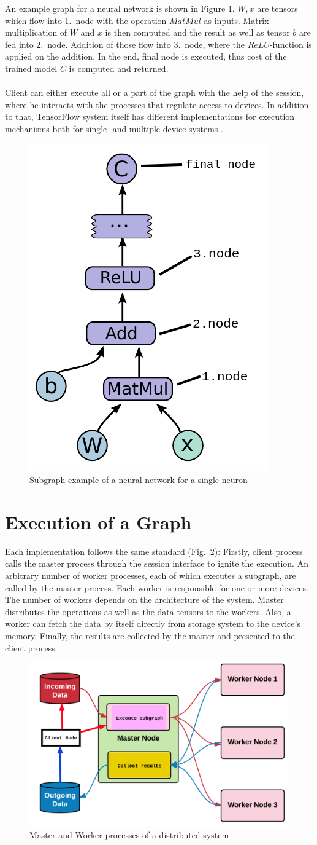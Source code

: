 \documentclass[ieeetran]{article}
\begin{document}
An example graph for a neural network is shown in Figure 1. $W, x$ are tensors which flow into 1.\ node with the operation $MatMul$ as inputs. Matrix multiplication of $W$ and $x$ is then computed and the result as well as tensor $b$ are fed into 2.\ node. Addition of those flow into 3.\ node, where the $ReLU$-function is applied on the addition. In the end, final node is executed, thus cost of the trained model $C$ is computed and returned.
\\ \\Client can either execute all or a part of the graph with the help of the session, where he interacts with the processes that regulate access to devices. In addition to that, TensorFlow system itself has different implementations for execution mechanisms both for single- and multiple-device systems \cite{first}.
\begin{figure}[h!]
  \centering
   \includegraphics[width=0.25\linewidth]{graph}
\caption[placeholder]{Subgraph example of a neural network for a single neuron\footnotemark}
  \label{fig:graph_caption_placeholder_subgraph_example_for_a_neural_networkfootnotemark}
\end{figure}
\section{Execution of a Graph} %
\label{sec:execution_of_a_graph}
Each implementation follows the same standard (Fig.\ 2): Firstly, client process calls the master process through the session interface to ignite the execution. An arbitrary number of worker processes, each of which executes a subgraph, are called by the master process. Each worker is responsible for one or more devices. The number of workers depends on the architecture of the system. Master distributes the operations as well as the data tensors to the workers. Also, a worker can fetch the data by itself directly from storage system to the device's memory. Finally, the results are collected by the master and presented to the client process \cite{first}.
\begin{figure}[h!]
  \centering
\includegraphics[width=0.5\linewidth]{executionofgraph}
 \caption[placeholder]{Master and Worker processes of a distributed system\footnotemark} 
  \label{fig:executionofgraph}
\end{figure}
\end{document}
